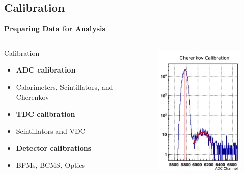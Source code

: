\documentclass[12pt]{beamer}
\begin{document}
\subsection[Calibration]{Calibration}
\begin{frame}
\textbf{Preparing Data for Analysis}
\begin{columns}[]
\begin{block}{Calibration}
	\begin{itemize}
		\item[] \textbf{ADC calibration}
		\item Calorimeters, Scintillators, and Cherenkov
		\item[] \textbf{TDC calibration}
		\item Scintillators and VDC
		\item[] \textbf{Detector calibrations} 
		\item BPMs, BCMS, Optics 
	\end{itemize}
\end{block}
\begin{figure}
	\vspace*{-0.25cm}
	\includegraphics[width=5cm,height=6.5cm]{../images/gc_calib.png}
\end{figure}

\end{columns}
\end{frame}
\end{document}
